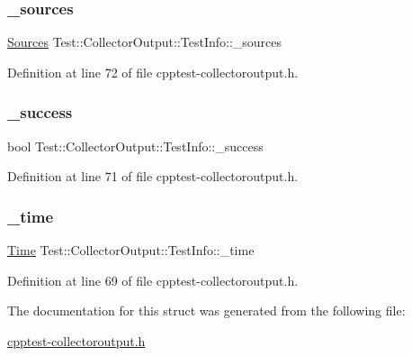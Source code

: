 \subsubsection{\texorpdfstring{\+\_\+sources}{\_sources}}
{\footnotesize\ttfamily \mbox{\hyperlink{class_test_1_1_collector_output_a1921f35e0da596bd75da5824afe872c9}{Sources}} Test\+::\+Collector\+Output\+::\+Test\+Info\+::\+\_\+sources}



Definition at line 72 of file cpptest-\/collectoroutput.\+h.

\mbox{\label{struct_test_1_1_collector_output_1_1_test_info_a99a6450e62566587a15c9ae9b7073ae7}} 
\subsubsection{\texorpdfstring{\+\_\+success}{\_success}}
{\footnotesize\ttfamily bool Test\+::\+Collector\+Output\+::\+Test\+Info\+::\+\_\+success}



Definition at line 71 of file cpptest-\/collectoroutput.\+h.

\mbox{\label{struct_test_1_1_collector_output_1_1_test_info_a59094663d5e7e2a7d896ce574ae6ef1b}} 
\subsubsection{\texorpdfstring{\+\_\+time}{\_time}}
{\footnotesize\ttfamily \mbox{\hyperlink{class_test_1_1_time}{Time}} Test\+::\+Collector\+Output\+::\+Test\+Info\+::\+\_\+time}



Definition at line 69 of file cpptest-\/collectoroutput.\+h.



The documentation for this struct was generated from the following file\+:\begin{DoxyCompactItemize}
\item 
\mbox{\hyperlink{cpptest-collectoroutput_8h}{cpptest-\/collectoroutput.\+h}}\end{DoxyCompactItemize}
